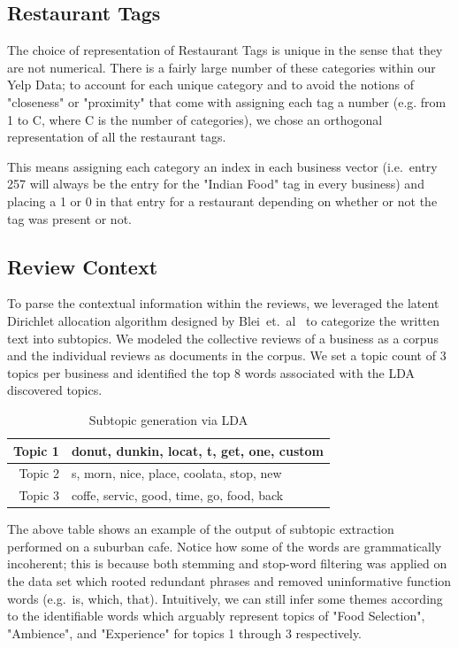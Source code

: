 \documentclass[10pt,twocolumn,letterpaper]{article}
\begin{document}
\subsection{Restaurant Tags}

The choice of representation of Restaurant Tags is unique in the sense that they are not numerical. There is a fairly large number of these categories within our Yelp Data; to account for each unique category and to avoid the notions of "closeness" or
"proximity" that come with assigning each tag a number (e.g. from 1 to C, where C is
the number of categories), we chose an orthogonal representation of all the
restaurant tags.

This means assigning each category an index in each business vector
(i.e.\ entry 257 will always be the entry for the "Indian Food" tag in every
business) and placing a 1 or 0 in that entry for a restaurant depending on whether or not the tag was present or not.

\subsection{Review Context}

To parse the contextual information within the reviews, we leveraged the latent
Dirichlet allocation algorithm designed by Blei~et.\ al~\cite{LDA_original} to
categorize the written text into subtopics. We modeled the collective reviews of
a business as a corpus and the individual reviews as documents in the corpus. We
set a topic count of 3 topics per business and identified the top 8 words
associated with the LDA discovered topics.\\

\begin{table}[H]
  \centering
  \begin{tabular}{|r|l|}
    \hline
    Topic 1 & donut, dunkin, locat, t, get, one, custom\tabularnewline
    \hline
    Topic 2 & s, morn, nice, place, coolata, stop, new \tabularnewline
    \hline
    Topic 3 & coffe, servic, good, time, go, food, back\tabularnewline
    \hline
  \end{tabular}
  \caption{Subtopic generation via LDA}\label{table:LDA_example}
\end{table}


The above table shows an example of the output of subtopic extraction performed
on a suburban cafe. Notice how some of the words are grammatically incoherent;
this is because both stemming and stop-word filtering was applied on the data
set which rooted redundant phrases and removed uninformative function words
(e.g.\ is, which, that). Intuitively, we can still infer some themes according to
the identifiable words which arguably represent topics of "Food Selection",
"Ambience", and "Experience" for topics 1 through 3 respectively.
\end{document}

